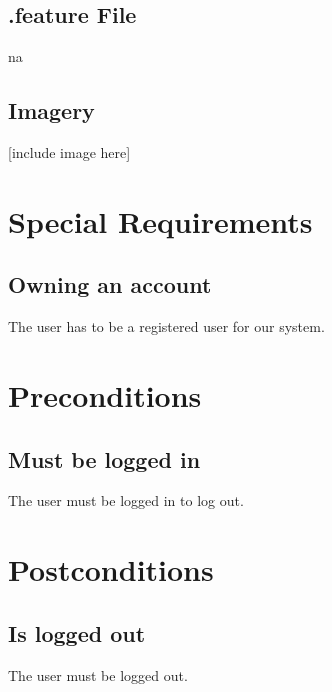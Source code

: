 \documentclass[a4paper,12pt,chapterprefix=false,bibliography=totoc,listof=totoc,book]{scrreprt}
\begin{document}
    \section{.feature File}
    \gls{na}

    \section{Imagery}
    [include image here]

    \chapter{Special Requirements}
    \section{Owning an account}
    The user has to be a registered user for our system.

    \chapter{Preconditions}
    \section{Must be logged in}
    The user must be logged in to log out.

    \chapter{Postconditions}
    \section{Is logged out}
    The user must be logged out.
\end{document}
